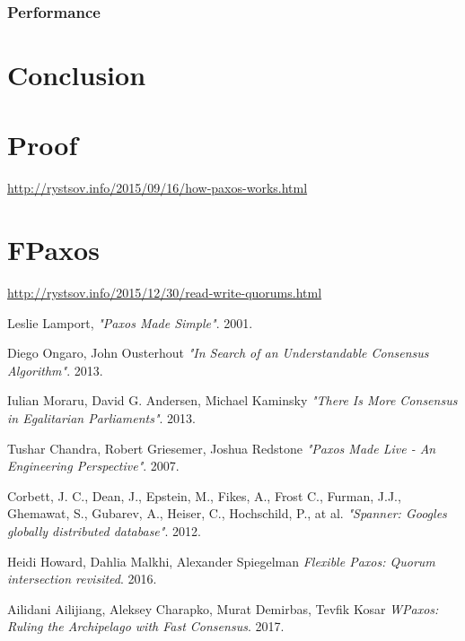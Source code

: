 \documentclass[12pt]{article}
\begin{document}
\subsubsection{Performance}
\section{Conclusion}

\begin{appendices}
\section{Proof}
\href{http://rystsov.info/2015/09/16/how-paxos-works.html}{http://rystsov.info/2015/09/16/how-paxos-works.html}

\section{FPaxos}
\label{appendix:fpaxos}
\href{http://rystsov.info/2015/12/30/read-write-quorums.html}{http://rystsov.info/2015/12/30/read-write-quorums.html}

\end{appendices}

\newpage

\begin{thebibliography}{9}

  Leslie Lamport,
  \emph{"Paxos Made Simple"}.
  2001.

  Diego Ongaro, John Ousterhout
  \emph{"In Search of an Understandable Consensus Algorithm"}.
  2013.

  Iulian Moraru, David G. Andersen, Michael Kaminsky
  \emph{"There Is More Consensus in Egalitarian Parliaments"}.
  2013.

  Tushar Chandra, Robert Griesemer, Joshua Redstone
  \emph{"Paxos Made Live - An Engineering Perspective"}.
  2007.

  Corbett, J. C., Dean, J., Epstein, M., Fikes, A., Frost C., Furman, J.J., Ghemawat, S., Gubarev, A., Heiser, C., Hochschild, P., at al.
  \emph{"Spanner: Googles globally distributed database"}.
  2012.

  Heidi Howard, Dahlia Malkhi, Alexander Spiegelman
  \emph{Flexible Paxos: Quorum intersection revisited}.
  2016.

  Ailidani Ailijiang, Aleksey Charapko, Murat Demirbas, Tevfik Kosar
  \emph{WPaxos: Ruling the Archipelago with Fast Consensus}.
  2017.

\end{thebibliography}
\end{document}

